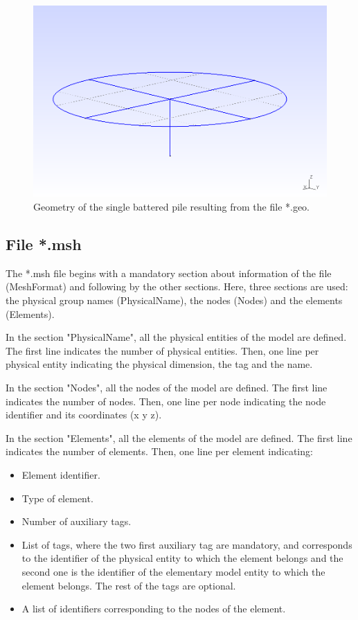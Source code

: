 \documentclass[a4]{article}
\begin{document}
\begin{figure}[h]
	\centering
	\includegraphics[scale = 0.58]{geometry.png}
	\caption{Geometry of the single battered pile resulting from the file *.geo.} 
	\label{fig:geometry_single_battered_pile}
\end{figure}

\subsection{File *.msh}

The *.msh file begins with a mandatory section about information of the file (MeshFormat) and following by the other sections. Here, three sections are used: the physical group names (PhysicalName), the nodes (Nodes) and the elements (Elements).

In the section "PhysicalName", all the physical entities of the model are defined. The first line indicates the number of physical entities. Then, one line per physical entity indicating the physical dimension, the tag and the name.  

In the section "Nodes", all the nodes of the model are defined. The first line indicates the number of nodes. Then, one line per node indicating the node identifier and its coordinates (x y z).

In the section "Elements", all the elements of the model are defined. The first line indicates the number of elements. Then, one line per element indicating:

\begin{itemize}
	\item Element identifier.
	\item Type of element.
	\item Number of auxiliary tags.
	\item List of tags, where the two first auxiliary tag are mandatory, and corresponds to the identifier of the physical entity to which the element belongs and the second one is the identifier of the elementary model entity to which the element belongs. The rest of the tags are optional.
	\item A list of identifiers corresponding to the nodes of the element.
\end{itemize}
\end{document}
